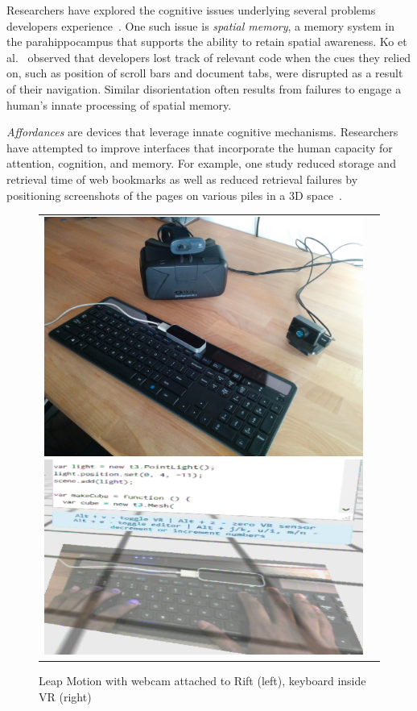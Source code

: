 \documentclass[conference]{IEEEtran}
\begin{document}
Researchers have explored the cognitive issues underlying several problems developers experience~\cite{Parnin:2012}.
One such issue is \emph{spatial memory}, a memory system in the parahippocampus that supports the ability to retain spatial awareness. 
Ko et al.~\cite{Ko:2006} observed that developers lost track of relevant code when the cues they relied on, such as position of scroll bars and document tabs, were disrupted as a result of their navigation.
Similar disorientation often results from failures to engage a human's innate processing of spatial memory. 

\emph{Affordances} are devices that leverage innate cognitive mechanisms.
Researchers have attempted to improve interfaces that incorporate the human capacity for attention, cognition, and memory.
For example, one study reduced storage and retrieval time of web bookmarks as well as reduced retrieval failures by positioning screenshots of the pages on various piles in a 3D space~\cite{Robertson:1998}.

\begin{figure}[ht]
\centering
\begin{tabular}{cc}
	\includegraphics[width=.45\linewidth]{figures/setup/equipment}\label{fig:rift}
 	\includegraphics[width=.45\linewidth]{figures/setup/webcam_passthrough}\label{fig:leap}
\end{tabular}
\caption{Leap Motion with webcam attached to Rift (left), keyboard inside VR (right)}
\end{figure}
\end{document}
